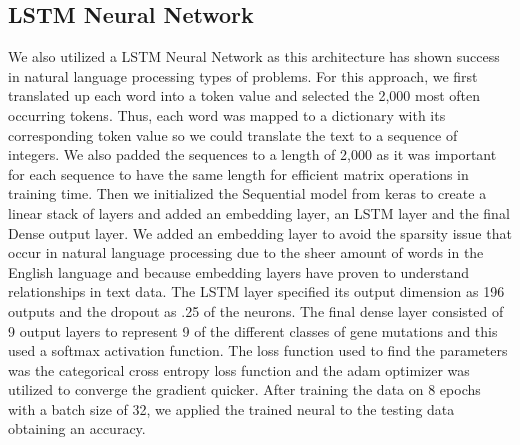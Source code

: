 \documentclass{article}
\begin{document}
    
    \subsection{LSTM Neural Network}
    We also utilized a LSTM Neural Network as this architecture has shown success in natural language processing types of problems. For this approach, we first translated up each word into a token value and selected the 2,000 most often occurring tokens. Thus, each word was mapped to a dictionary with its corresponding token value so we could translate the text to a sequence of integers. We also padded the sequences to a length of 2,000 as it was important for each sequence to have the same length for efficient matrix operations in training time. Then we initialized the Sequential model from keras to create a linear stack of layers and added an embedding layer, an LSTM layer and the final Dense output layer. We added an embedding layer to avoid the sparsity issue that occur in natural language processing due to the sheer amount of words in the English language and because embedding layers have proven to understand relationships in text data. The LSTM layer specified its output dimension as 196 outputs and the dropout as .25 of the neurons. The final dense layer consisted of 9 output layers to represent 9 of the different classes of gene mutations and this used  a softmax activation function. The loss function used to find the parameters was the categorical cross entropy loss function and the adam optimizer was utilized to converge the gradient quicker. After training the data on 8 epochs with a batch size of 32, we applied the trained neural to the testing data obtaining an accuracy.
    

    
    
    
\end{document}
